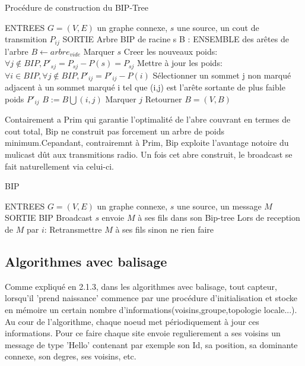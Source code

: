 \begin{algorithm}[h]
\caption{Procédure de construction du BIP-Tree}
\label{algo_BIP_tree}
\begin{algorithmic}
\STATE ENTREES  $G=(V,E)$ un graphe connexe, $s$ une source, un cout de transmition $P_{ij}$
\STATE SORTIE  Arbre BIP de racine s
\STATE B : ENSEMBLE des arêtes de l'arbre
\STATE  $B \leftarrow arbre_{vide}$
\STATE Marquer $s$
\STATE Creer les nouveaux poids: $\forall j \notin BIP, P'_{sj}=P_{sj}-P(s)=P_{sj}$
   \STATE Mettre à jour les poids:  $ \forall i \in BIP, \forall j \notin BIP, P'_{ij}=P'_{ij}-P(i)$
   \STATE Sélectionner un sommet j non marqué adjacent à un sommet marqué i tel que (i,j) est l'arête sortante de plus faible poids $P'_{ij}$
   \STATE $B := B\bigcup   {(i,j)}$
   \STATE Marquer $j$
\ENDWHILE
\STATE Retourner $B=(V,B)$
\end{algorithmic}
\end{algorithm}

Contairement a Prim qui garantie l'optimalité de l'abre couvrant en termes de cout total,
Bip ne construit pas forcement un arbre de poids minimum.Cepandant, contrairemnt à Prim, Bip exploite l'avantage notoire du mulicast dût aux transmitions radio. Un fois cet abre construit, le broadcast se fait naturellement via celui-ci.


\begin{algorithm}[h]
\caption{BIP}
\label{algo_BIP}
\begin{algorithmic}
\STATE ENTREES  $G=(V,E)$ un graphe connexe, $s$ une source, un message $M$
\STATE SORTIE  BIP Broadcast
\STATE $s$ envoie $M$ à ses fils dans son Bip-tree
\STATE Lors de reception de $M$ par $i$:
    \STATE Retransmettre $M$ à ses fils sinon ne rien faire
\ENDIF
\end{algorithmic}
\end{algorithm}




\subsection{Algorithmes avec balisage}
Comme expliqué en 2.1.3, dans les algorithmes avec balisage, tout capteur, lorsqu'il 'prend naissance' commence par une procédure d'initialisation et stocke en 
mémoire un certain nombre d'informations(voisins,groupe,topologie locale...). Au cour de l'algorithme, chaque noeud met périodiquement à jour ces informations. Pour ce faire chaque site envoie regulierement a ses voisins un message de type
'Hello' contenant par exemple son Id, sa position, sa dominante connexe, son degres, ses voisins, etc.\\
